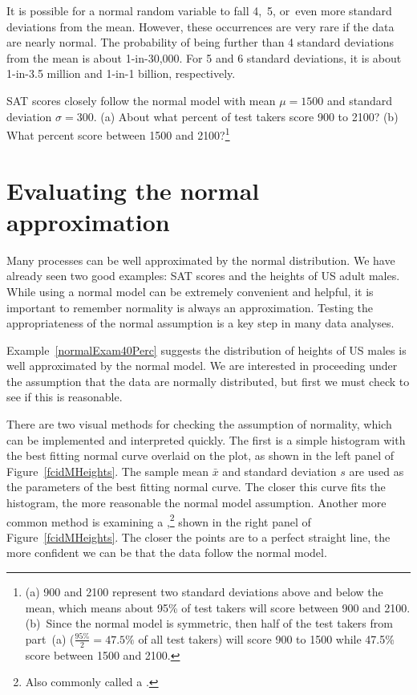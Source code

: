 It is possible for a normal random variable to fall 4,~5, or~even more standard deviations from the mean. However, these occurrences are very rare if the data are nearly normal. The probability of being further than 4 standard deviations from the mean is about 1-in-30,000. For 5 and 6 standard deviations, it is about 1-in-3.5 million and 1-in-1 billion, respectively.

\begin{exercise}
SAT scores closely follow the normal model with mean $\mu = 1500$ and standard deviation $\sigma = 300$. (a) About what percent of test takers score 900 to 2100? (b) What percent score between 1500 and 2100?\footnote{(a) 900 and 2100 represent two standard deviations above and below the mean, which means about 95\% of test takers will score between 900 and 2100. (b)~Since the normal model is symmetric, then half of the test takers from part~(a) ($\frac{95\%}{2} = 47.5\%$ of all test takers) will score 900 to 1500 while 47.5\% score between 1500 and 2100.}
\end{exercise}

\section{Evaluating the normal approximation}
\label{assessingNormal}

Many processes can be well approximated by the normal distribution. We have already seen two good examples: SAT scores and the heights of US adult males. While using a normal model can be extremely convenient and helpful, it is important to remember normality is always an approximation. Testing the appropriateness of the normal assumption is a key step in many data analyses.


Example~\ref{normalExam40Perc} suggests the distribution of heights of US males is well approximated by the normal model. We are interested in proceeding under the assumption that the data are normally distributed, but first we must check to see if this is reasonable.

There are two visual methods for checking the assumption of normality, which can be implemented and interpreted quickly. The first is a simple histogram with the best fitting normal curve overlaid on the plot, as shown in the left panel of Figure~\ref{fcidMHeights}. The sample mean $\bar{x}$ and standard deviation $s$ are used as the parameters of the best fitting normal curve. The closer this curve fits the histogram, the more reasonable the normal model assumption. Another more common method is examining a ,\footnote{Also commonly called a .} shown in the right panel of Figure~\ref{fcidMHeights}. The closer the points are to a perfect straight line, the more confident we can be that the data follow the normal model.


